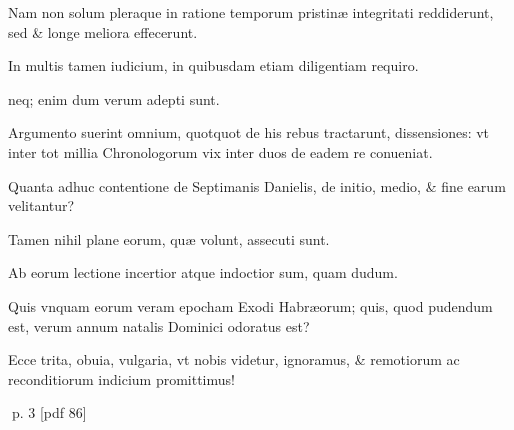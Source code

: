 \begin{parnumbers}
Nam non solum pleraque in ratione temporum pristinæ integritati reddiderunt, sed \& longe meliora effecerunt.

In multis tamen iudicium, in quibusdam etiam diligentiam requiro.

neq; enim dum verum adepti sunt.

Argumento suerint omnium, quotquot de his rebus tractarunt, dissensiones: vt inter tot millia Chronologorum vix inter duos de eadem re
conueniat.

Quanta adhuc contentione de Septimanis Danielis, de initio, medio, \& fine earum velitantur?

Tamen nihil plane eorum, quæ volunt, assecuti sunt.

Ab eorum lectione incertior atque indoctior sum, quam dudum.

Quis vnquam eorum veram epocham Exodi Habræorum; quis, quod pudendum est, verum annum natalis Dominici odoratus est?

Ecce trita, obuia, vulgaria, vt nobis videtur, ignoramus, \& remotiorum ac reconditiorum indicium promittimus!

\end{parnumbers}
\clearpage
p. 3 [pdf 86]

